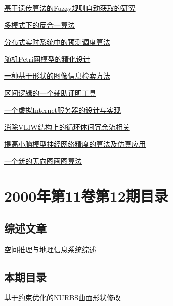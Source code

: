 \documentclass[a4paper]{article}
\begin{document}
\href{http://www.jos.org.cn/ch/reader/download_pdf.aspx?file_no=20000111&year_id=2000&quarter_id=1&falg=1}{基于遗传算法的Fuzzy规则自动获取的研究}

\href{http://www.jos.org.cn/ch/reader/download_pdf.aspx?file_no=20000112&year_id=2000&quarter_id=1&falg=1}{多模式下的反合一算法}

\href{http://www.jos.org.cn/ch/reader/download_pdf.aspx?file_no=20000113&year_id=2000&quarter_id=1&falg=1}{分布式实时系统中的预测调度算法}

\href{http://www.jos.org.cn/ch/reader/download_pdf.aspx?file_no=20000114&year_id=2000&quarter_id=1&falg=1}{随机Petri网模型的精化设计}

\href{http://www.jos.org.cn/ch/reader/download_pdf.aspx?file_no=20000115&year_id=2000&quarter_id=1&falg=1}{一种基于形状的图像信息检索方法}

\href{http://www.jos.org.cn/ch/reader/download_pdf.aspx?file_no=20000116&year_id=2000&quarter_id=1&falg=1}{区间逻辑的一个辅助证明工具}

\href{http://www.jos.org.cn/ch/reader/download_pdf.aspx?file_no=20000117&year_id=2000&quarter_id=1&falg=1}{一个虚拟Internet服务器的设计与实现}

\href{http://www.jos.org.cn/ch/reader/download_pdf.aspx?file_no=20000118&year_id=2000&quarter_id=1&falg=1}{消除VLIW结构上的循环体间冗余流相关}

\href{http://www.jos.org.cn/ch/reader/download_pdf.aspx?file_no=20000119&year_id=2000&quarter_id=1&falg=1}{提高小脑模型神经网络精度的算法及仿真应用}

\href{http://www.jos.org.cn/ch/reader/download_pdf.aspx?file_no=20000120&year_id=2000&quarter_id=1&falg=1}{一个新的无向图画图算法}


\section{\textbf{2000年第11卷第12期目录}}
\subsection{综述文章}
\href{http://www.jos.org.cn/ch/reader/download_pdf.aspx?file_no=20001206&year_id=2000&quarter_id=12&falg=1}{空间推理与地理信息系统综述}

\subsection{本期目录}
\href{http://www.jos.org.cn/ch/reader/download_pdf.aspx?file_no=20001201&year_id=2000&quarter_id=12&falg=1}{基于约束优化的NURBS曲面形状修改}
\end{document}
